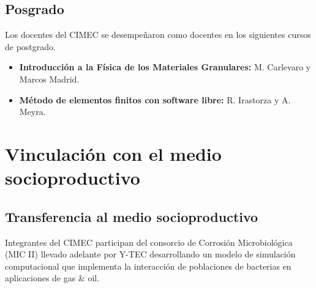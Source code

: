 \documentclass[a4paper,11pt,twoside,final,titlepage,onecolumn,openright]{report}
\begin{document}
\section{Posgrado}

Los docentes del CIMEC se desempeñaron como docentes en los siguientes cursos de postgrado.

\begin{itemize}
  \item \textbf{Introducción a la Física de los Materiales Granulares:} M. Carlevaro y Marcos Madrid.
	\item \textbf{Método de elementos finitos con software libre:} R. Irastorza y A. Meyra.
\end{itemize}

%



\chapter{Vinculación con el medio socioproductivo}

\section{Transferencia al medio socioproductivo}

Integrantes del CIMEC participan del consorcio de Corrosión Microbiológica (MIC II) llevado adelante por Y-TEC desarrollando un modelo de simulación computacional que implementa la interacción de poblaciones de bacterias en aplicaciones de gas \& oil.
\end{document}
